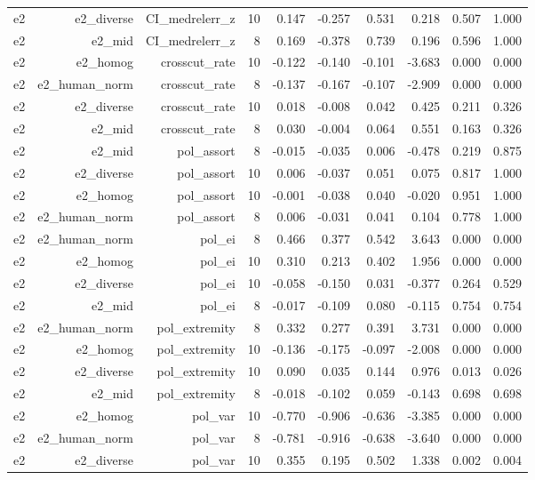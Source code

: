 \documentclass[11pt]{article}
\begin{document}
\begin{landscape}
\begin{longtable}{@{}lrrrrrrrrr@{}}
e2 & e2\_diverse & CI\_medrelerr\_z & 10 & 0.147 & -0.257 & 0.531 & 0.218 & 0.507 & 1.000 \\
e2 & e2\_mid & CI\_medrelerr\_z & 8 & 0.169 & -0.378 & 0.739 & 0.196 & 0.596 & 1.000 \\
e2 & e2\_homog & crosscut\_rate & 10 & -0.122 & -0.140 & -0.101 & -3.683 & 0.000 & 0.000 \\
e2 & e2\_human\_norm & crosscut\_rate & 8 & -0.137 & -0.167 & -0.107 & -2.909 & 0.000 & 0.000 \\
e2 & e2\_diverse & crosscut\_rate & 10 & 0.018 & -0.008 & 0.042 & 0.425 & 0.211 & 0.326 \\
e2 & e2\_mid & crosscut\_rate & 8 & 0.030 & -0.004 & 0.064 & 0.551 & 0.163 & 0.326 \\
e2 & e2\_mid & pol\_assort & 8 & -0.015 & -0.035 & 0.006 & -0.478 & 0.219 & 0.875 \\
e2 & e2\_diverse & pol\_assort & 10 & 0.006 & -0.037 & 0.051 & 0.075 & 0.817 & 1.000 \\
e2 & e2\_homog & pol\_assort & 10 & -0.001 & -0.038 & 0.040 & -0.020 & 0.951 & 1.000 \\
e2 & e2\_human\_norm & pol\_assort & 8 & 0.006 & -0.031 & 0.041 & 0.104 & 0.778 & 1.000 \\
e2 & e2\_human\_norm & pol\_ei & 8 & 0.466 & 0.377 & 0.542 & 3.643 & 0.000 & 0.000 \\
e2 & e2\_homog & pol\_ei & 10 & 0.310 & 0.213 & 0.402 & 1.956 & 0.000 & 0.000 \\
e2 & e2\_diverse & pol\_ei & 10 & -0.058 & -0.150 & 0.031 & -0.377 & 0.264 & 0.529 \\
e2 & e2\_mid & pol\_ei & 8 & -0.017 & -0.109 & 0.080 & -0.115 & 0.754 & 0.754 \\
e2 & e2\_human\_norm & pol\_extremity & 8 & 0.332 & 0.277 & 0.391 & 3.731 & 0.000 & 0.000 \\
e2 & e2\_homog & pol\_extremity & 10 & -0.136 & -0.175 & -0.097 & -2.008 & 0.000 & 0.000 \\
e2 & e2\_diverse & pol\_extremity & 10 & 0.090 & 0.035 & 0.144 & 0.976 & 0.013 & 0.026 \\
e2 & e2\_mid & pol\_extremity & 8 & -0.018 & -0.102 & 0.059 & -0.143 & 0.698 & 0.698 \\
e2 & e2\_homog & pol\_var & 10 & -0.770 & -0.906 & -0.636 & -3.385 & 0.000 & 0.000 \\
e2 & e2\_human\_norm & pol\_var & 8 & -0.781 & -0.916 & -0.638 & -3.640 & 0.000 & 0.000 \\
e2 & e2\_diverse & pol\_var & 10 & 0.355 & 0.195 & 0.502 & 1.338 & 0.002 & 0.004 \\

\end{longtable}
\end{landscape}
\end{document}
